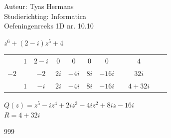 \documentclass[a4paper]{article}
\begin{document}
  
\noindent \large Auteur: Tyas Hermans \\
\noindent \large Studierichting: Informatica\\
\noindent \large Oefeningenreeks 1D nr. 10.10\\

\medskip

\normalsize

$z^6 + (2-i)z^5 + 4$\\
\begin{tabular}{c|cccccccccc}
& $1$ & $2-i$ & $0$ & $0$ & $0$ & $0$ & \vline & $4$ \\
$-2$ & & $-2$ & $2i$ & $-4i$ & $8i$ & $-16i$ & \vline & $32i$ \\ \hline
& $1$ & $-i$ & $2i$ & $-4i$ & $8i$ & $-16i$ & \vline & $4+32i$ \\
\end{tabular}

$Q(z) = z^5 -iz^4 +2iz^3 - 4iz^2 + 8iz -16i$\\

$R = 4 + 32i$\\


\begin{thebibliography}{999}
\end{thebibliography}
\end{document}
